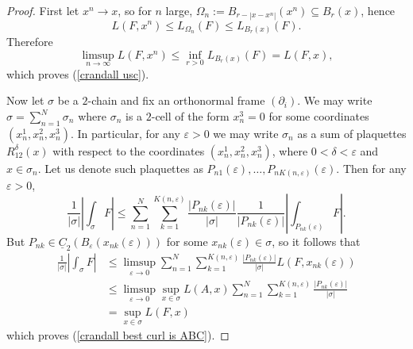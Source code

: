 \documentclass[reqno,11pt]{amsart}
\newcommand*\dif{\mathop{}\!\mathrm{d}}
\newcommand{\Chain}{\underline C}
\theoremstyle{definition}
\numberwithin{equation}{section}
\begin{document}
\begin{proof}
First let $x^n \to x$, so for $n$ large, $\Omega_n := B_{r - |x - x^n|}(x^n) \subseteq B_r(x)$, hence
$$L(F, x^n) \leq L_{\Omega_n}(F) \leq L_{B_r(x)}(F).$$
Therefore 
$$\limsup_{n \to \infty} L(F, x^n) \leq \inf_{r > 0} L_{B_r(x)}(F) = L(F, x),$$
which proves (\ref{crandall usc}).
	

Now let $\sigma$ be a $2$-chain and fix an orthonormal frame $(\partial_i)$.
We may write $\sigma = \sum_{n=1}^N \sigma_n$ where $\sigma_n$ is a $2$-cell of the form $x^3_n = 0$ for some coordinates $(x^1_n, x^2_n, x^3_n)$.
In particular, for any $\varepsilon > 0$ we may write $\sigma_n$ as a sum of plaquettes $R_{12}^\delta(x)$ with respect to the coordinates $(x^1_n, x^2_n, x^3_n)$, where $0 < \delta < \varepsilon$ and $x \in \sigma_n$.
Let us denote such plaquettes as $P_{n1}(\varepsilon), \dots, P_{nK(n, \varepsilon)}(\varepsilon)$. Then for any $\varepsilon > 0$, 
$$\frac{1}{|\sigma|} \left|\int_\sigma F\right| \leq \sum_{n=1}^N \sum_{k=1}^{K(n, \varepsilon)} \frac{|P_{nk}(\varepsilon)|}{|\sigma|} \frac{1}{|P_{nk}(\varepsilon)|} \left|\int_{P_{nk}(\varepsilon)} F\right|.$$
But $P_{nk} \in \Chain_2(B_\varepsilon(x_{nk}(\varepsilon)))$ for some $x_{nk}(\varepsilon) \in \sigma$, so it follows that 
\begin{align*}
\frac{1}{|\sigma|} \left|\int_\sigma F\right|
&\leq \limsup_{\varepsilon \to 0} \sum_{n=1}^N \sum_{k=1}^{K(n, \varepsilon)} \frac{|P_{nk}(\varepsilon)|}{|\sigma|} L(F, x_{nk}(\varepsilon)) \\
&\leq \limsup_{\varepsilon \to 0} \sup_{x \in \sigma} L(A, x)  \sum_{n=1}^N \sum_{k=1}^{K(n, \varepsilon)} \frac{|P_{nk}(\varepsilon)|}{|\sigma|} \\
&= \sup_{x \in \sigma} L(F, x)
\end{align*}
which proves (\ref{crandall best curl is ABC}).


\end{proof}
\end{document}
